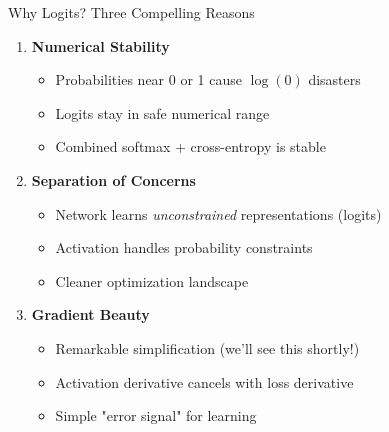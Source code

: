 \documentclass[xcolor=svgnames, 8pt, handout, standalone]{beamer}
\newcommand{\1}{\mathbf{1}}
\begin{document}
\begin{frame}{Why Logits? Three Compelling Reasons}
\begin{enumerate}
\item<1-> \textbf{Numerical Stability}
\begin{itemize}
\item Probabilities near 0 or 1 cause $\log(0)$ disasters
\item Logits stay in safe numerical range
\item Combined softmax + cross-entropy is stable
\end{itemize}

\vspace{0.3em}
\item<2-> \textbf{Separation of Concerns}
\begin{itemize}
\item Network learns \textit{unconstrained} representations (logits)
\item Activation handles probability constraints
\item Cleaner optimization landscape
\end{itemize}

\vspace{0.3em}
\item<3-> \textbf{Gradient Beauty}
\begin{itemize}
\item Remarkable simplification (we'll see this shortly!)
\item Activation derivative cancels with loss derivative
\item Simple "error signal" for learning
\end{itemize}
\end{enumerate}
\end{frame}
\end{document}
